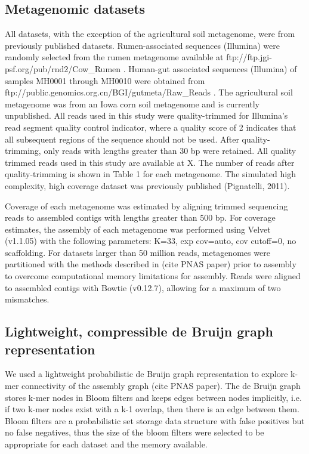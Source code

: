 \documentclass[11pt]{article} %
\begin{document}
\subsection{Metagenomic datasets}
All datasets, with the exception of the agricultural soil metagenome, were from previously published datasets. Rumen-associated sequences (Illumina) were randomly selected from the rumen metagenome available at ftp://ftp.jgi-psf.org/pub/rnd2/Cow\_Rumen \cite{Hess:2011p686}. Human-gut associated sequences (Illumina) of samples MH0001 through MH0010 were obtained from ftp://public.genomics.org.cn/BGI/gutmeta/Raw\_Reads \cite{Qin:2010p189}. The agricultural soil metagenome was from an Iowa corn soil metagenome and is currently unpublished. All reads used in this study were quality-trimmed for Illumina's read segment quality control indicator, where a quality score of 2 indicates that all subsequent regions of the sequence should not be used. After quality-trimming, only reads with lengths greater than 30 bp were retained. All quality trimmed reads used in this study are available at X.  The number of reads after quality-trimming is shown in Table 1 for each metagenome. The simulated high complexity, high coverage dataset was previously published (Pignatelli, 2011).  

Coverage of each metagenome was estimated by aligning trimmed sequencing reads to assembled contigs with lengths greater than 500 bp.  For coverage estimates, the assembly of each metagenome was performed using Velvet (v1.1.05) with the following parameters:  K=33, exp cov=auto, cov cutoff=0, no scaffolding.  For datasets larger than 50 million reads, metagenomes were partitioned with the methods described in (cite PNAS paper) prior to assembly to overcome computational memory limitations for assembly.  Reads were aligned to assembled contigs with Bowtie (v0.12.7), allowing for a maximum of two mismatches.  

\subsection{Lightweight, compressible de Bruijn graph representation}
We used a lightweight probabilistic de Bruijn graph representation to explore k-mer connectivity of the assembly graph (cite PNAS paper). The de Bruijn graph stores k-mer nodes in Bloom filters and keeps edges between nodes implicitly, i.e. if two k-mer nodes exist with a k-1 overlap, then there is an edge between them. Bloom filters are a probabilistic set storage data structure with false positives but no false negatives, thus the size of the bloom filters were selected to be appropriate for each dataset and the memory available.
	
\end{document}
